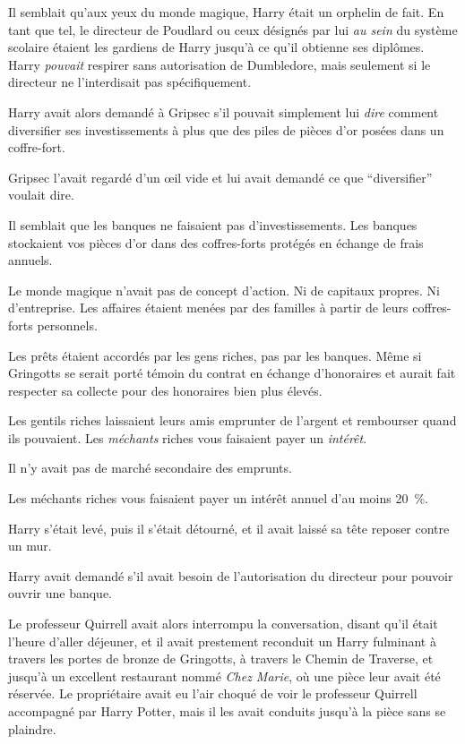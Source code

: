 Il semblait qu'aux yeux du monde magique, Harry était un orphelin de fait. En tant que tel, le directeur de Poudlard ou ceux désignés par lui \emph{au sein} du système scolaire étaient les gardiens de Harry jusqu'à ce qu'il obtienne ses diplômes. Harry \emph{pouvait} respirer sans autorisation de Dumbledore, mais seulement si le directeur ne l'interdisait pas spécifiquement.

Harry avait alors demandé à Gripsec s'il pouvait simplement lui \emph{dire} comment diversifier ses investissements à plus que des piles de pièces d'or posées dans un coffre-fort.

Gripsec l'avait regardé d'un œil vide et lui avait demandé ce que “diversifier” voulait dire.

Il semblait que les banques ne faisaient pas d'investissements. Les banques stockaient vos pièces d'or dans des coffres-forts protégés en échange de frais annuels.

Le monde magique n'avait pas de concept d'action. Ni de capitaux propres. Ni d'entreprise. Les affaires étaient menées par des familles à partir de leurs coffres-forts personnels.

Les prêts étaient accordés par les gens riches, pas par les banques. Même si Gringotts se serait porté témoin du contrat en échange d'honoraires et aurait fait respecter sa collecte pour des honoraires bien plus élevés.

Les gentils riches laissaient leurs amis emprunter de l'argent et rembourser quand ils pouvaient. Les \emph{méchants} riches vous faisaient payer un \emph{intérêt}.

Il n'y avait pas de marché secondaire des emprunts.

Les méchants riches vous faisaient payer un intérêt annuel d'au moins 20~\%.

Harry s'était levé, puis il s'était détourné, et il avait laissé sa tête reposer contre un mur.

Harry avait demandé s'il avait besoin de l'autorisation du directeur pour pouvoir ouvrir une banque.

Le professeur Quirrell avait alors interrompu la conversation, disant qu'il était l'heure d'aller déjeuner, et il avait prestement reconduit un Harry fulminant à travers les portes de bronze de Gringotts, à travers le Chemin de Traverse, et jusqu'à un excellent restaurant nommé \emph{Chez Marie}, où une pièce leur avait été réservée. Le propriétaire avait eu l'air choqué de voir le professeur Quirrell accompagné par Harry Potter, mais il les avait conduits jusqu'à la pièce sans se plaindre.

